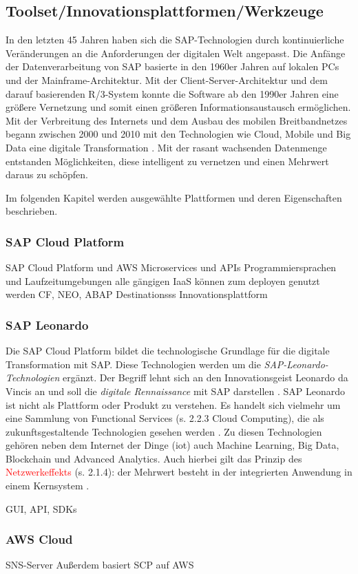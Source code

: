 \subsection{Toolset/Innovationsplattformen/Werkzeuge}
In den letzten 45 Jahren haben sich die SAP-Technologien durch kontinuierliche Veränderungen an die Anforderungen der digitalen Welt angepasst. Die Anfänge der Datenverarbeitung von SAP basierte in den 1960er Jahren auf lokalen PCs und der Mainframe-Architektur. Mit der Client-Server-Architektur und dem darauf basierenden R/3-System konnte die Software ab den 1990er Jahren eine größere Vernetzung und somit einen größeren Informationsaustausch ermöglichen. Mit der Verbreitung des Internets und dem Ausbau des mobilen Breitbandnetzes begann zwischen 2000 und 2010 mit den Technologien wie Cloud, Mobile und Big Data eine digitale Transformation \citep[S. 44]{Elsner2018}. Mit der rasant wachsenden Datenmenge entstanden Möglichkeiten, diese intelligent zu vernetzen und einen Mehrwert daraus zu schöpfen.

Im folgenden Kapitel werden ausgewählte Plattformen und deren Eigenschaften beschrieben.

\subsubsection{SAP Cloud Platform}


SAP Cloud Platform und AWS Microservices und APIs
Programmiersprachen und Laufzeitumgebungen
alle gängigen IaaS können zum deployen genutzt werden
CF, NEO, ABAP
Destinationsss
Innovationsplattform
\subsubsection{SAP Leonardo}

Die SAP Cloud Platform bildet die technologische Grundlage für die digitale Transformation mit SAP. Diese
Technologien werden um die \textit{SAP-Leonardo-Technologien} ergänzt. Der Begriff lehnt sich an den Innovationsgeist Leonardo da Vincis an und soll die \textit{digitale Rennaissance} mit SAP  darstellen \citep{Howells2017}.
SAP Leonardo ist nicht als Plattform oder Produkt zu verstehen. Es handelt sich vielmehr um eine Sammlung von Functional Services (s. 2.2.3 Cloud Computing), die als zukunftsgestaltende Technologien gesehen werden \citep{Elsner2018}. Zu diesen Technologien
gehören neben dem Internet der Dinge (\acf{iot}) auch Machine Learning, Big Data, Blockchain und Advanced Analytics.
Auch hierbei gilt das Prinzip des \textcolor{red}{Netzwerkeffekts} (s. 2.1.4): der Mehrwert besteht in der integrierten Anwendung in einem Kernsystem \citep{Elsner2018}.

GUI, API, SDKs

\subsubsection{AWS Cloud}
SNS-Server
Außerdem basiert SCP auf AWS



\newpage
